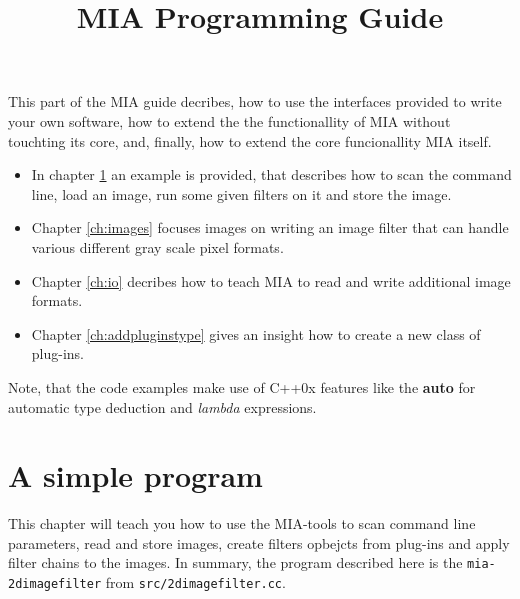 \documentclass[english, 10pt, a4paper,headsepline,openany]{scrbook}
\title{MIA Programming Guide}
\begin{document}
\lstset{numbers=left, numberstyle=\small, numbersep=5pt}

This part of the MIA guide decribes, how to use the interfaces provided to write your own software,
  how to extend the the functionallity of MIA without touchting its core, and, finally, how to 
  extend the core funcionallity MIA itself.
\begin{itemize}
\item In chapter \ref{ch:simple} an example is provided, that describes how to scan the command line, load an image, 
  run some given filters on it and store the image. 
\item Chapter \ref{ch:images} focuses images on writing an image filter that can handle various different 
   gray scale pixel formats.
\item Chapter \ref{ch:io} decribes how to teach MIA to read and write additional image formats. 
\item Chapter \ref{ch:addpluginstype} gives an insight how to create a new class of plug-ins.
\end{itemize}

Note, that the code examples make use of C++0x features like the {\bf auto} for automatic 
  type deduction and \emph{lambda} expressions. 

\chapter{A simple program}
\label{ch:simple}

This chapter will teach you how to use the MIA-tools to scan command line parameters, read and store images, 
  create filters opbejcts from plug-ins and apply filter chains to the images. 
In summary, the program described here is the \texttt{mia-2dimagefilter} from \texttt{src/2dimagefilter.cc}. 
\end{document}
